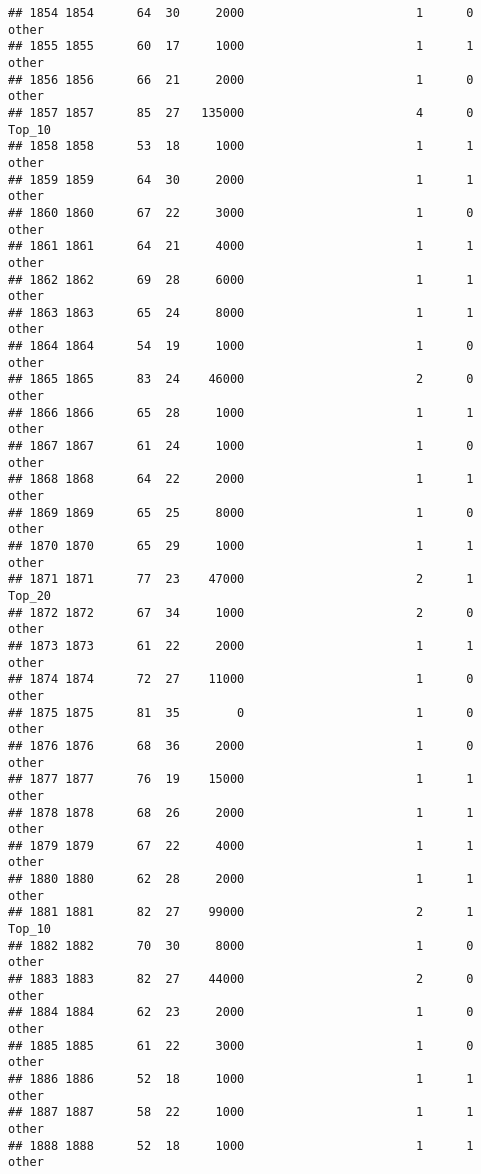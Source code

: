 \documentclass[
]{article}
\begin{document}
\begin{verbatim}
## 1854 1854      64  30     2000                        1      0    other
## 1855 1855      60  17     1000                        1      1    other
## 1856 1856      66  21     2000                        1      0    other
## 1857 1857      85  27   135000                        4      0   Top_10
## 1858 1858      53  18     1000                        1      1    other
## 1859 1859      64  30     2000                        1      1    other
## 1860 1860      67  22     3000                        1      0    other
## 1861 1861      64  21     4000                        1      1    other
## 1862 1862      69  28     6000                        1      1    other
## 1863 1863      65  24     8000                        1      1    other
## 1864 1864      54  19     1000                        1      0    other
## 1865 1865      83  24    46000                        2      0    other
## 1866 1866      65  28     1000                        1      1    other
## 1867 1867      61  24     1000                        1      0    other
## 1868 1868      64  22     2000                        1      1    other
## 1869 1869      65  25     8000                        1      0    other
## 1870 1870      65  29     1000                        1      1    other
## 1871 1871      77  23    47000                        2      1   Top_20
## 1872 1872      67  34     1000                        2      0    other
## 1873 1873      61  22     2000                        1      1    other
## 1874 1874      72  27    11000                        1      0    other
## 1875 1875      81  35        0                        1      0    other
## 1876 1876      68  36     2000                        1      0    other
## 1877 1877      76  19    15000                        1      1    other
## 1878 1878      68  26     2000                        1      1    other
## 1879 1879      67  22     4000                        1      1    other
## 1880 1880      62  28     2000                        1      1    other
## 1881 1881      82  27    99000                        2      1   Top_10
## 1882 1882      70  30     8000                        1      0    other
## 1883 1883      82  27    44000                        2      0    other
## 1884 1884      62  23     2000                        1      0    other
## 1885 1885      61  22     3000                        1      0    other
## 1886 1886      52  18     1000                        1      1    other
## 1887 1887      58  22     1000                        1      1    other
## 1888 1888      52  18     1000                        1      1    other

\end{verbatim}
\end{document}
